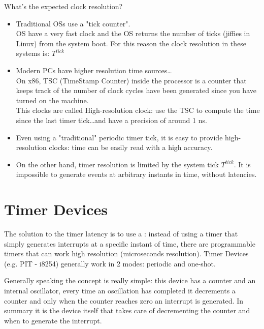 
What's the expected clock resolution?
\begin{itemize}
    \item Traditional OSs use a "tick counter". \\
    OS have a very fast clock and the OS returns the number of ticks (jiffies in Linux) from the system boot. For this reason the clock resolution in these systems is: $T^{tick}$
    \item Modern PCs have higher resolution time sources\dots\\
    On x86, TSC (TimeStamp Counter) inside the processor is a counter that keeps track of the number of clock cycles have been generated since you have turned on the machine.\\
    This clocks are called High-resolution clock: use the TSC to compute the time since the last timer tick\dots and have a precision of around 1 ns.
    \item Even using a "traditional" periodic timer tick, it is easy to provide high-resolution clocks: time can be easily read with a high accuracy. 
    \item On the other hand, timer resolution is limited by the system tick $T^{tick}$. It is impossible to generate events at arbitrary instants in time, without latencies.
\end{itemize}


\section{Timer Devices}
The solution to the timer latency is to use a : instead of using a timer that simply generates interrupts at a specific instant of time, there are programmable timers that can work high resolution (microseconds resolution).
Timer Devices (e.g. PIT - i8254) generally work in 2 modes: periodic and one-shot.

Generally speaking the concept is really simple: this device has a counter and an internal oscillator, every time an oscillation has completed it decrements a counter and only when the counter reaches zero an interrupt is generated. In summary it is the device itself that takes care of decrementing the counter and when to generate the interrupt.

